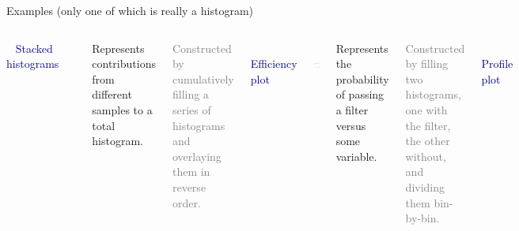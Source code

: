 \documentclass[aspectratio=169]{beamer}
\begin{document}
\begin{frame}{Examples (only one of which is really a histogram)}
\vspace{0.5 cm}
\begin{columns}
\mbox{ } \hfill \hfill \hfill \textcolor{darkblue}{Stacked histograms} \hfill \mbox{ }

\includegraphics[height=3.5 cm]{dileptons_fig_01b_mumu.png}

Represents contributions from different samples to a total histogram.

\vspace{0.25 cm}
\begin{minipage}{\linewidth}
\scriptsize \textcolor{gray}{Constructed by cumulatively filling a series of histograms and overlaying them in reverse order.}
\end{minipage}

\mbox{ } \hfill \hfill \textcolor{darkblue}{Efficiency plot} \hfill \mbox{ }

\mbox{ } \hfill \includegraphics[height=3.5 cm]{efficiency.png} \hfill \mbox{ }

Represents the probability of passing a filter versus some variable.

\vspace{0.25 cm}
\begin{minipage}{\linewidth}
\scriptsize \textcolor{gray}{Constructed by filling two histograms, one with the filter, the other without, and dividing them bin-by-bin.}
\end{minipage}

\mbox{ } \hfill \textcolor{darkblue}{Profile plot} \hfill \mbox{ }

\mbox{\hspace{-0.25 cm}}\includegraphics[height=3.5 cm]{profile_plot.png}


\end{columns}
\end{frame}
\end{document}
